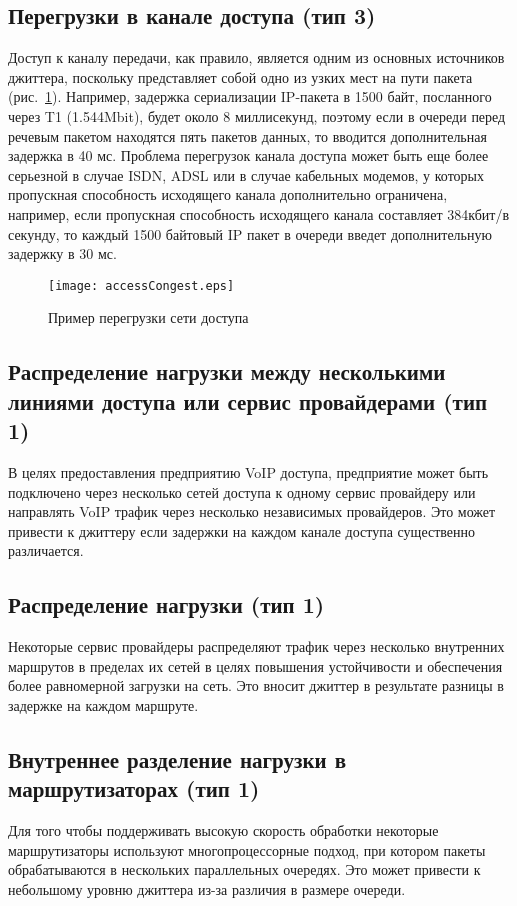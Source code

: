 \subsection{Перегрузки в канале доступа (тип 3) } \label{subsect2_1_3}
Доступ к каналу передачи, как правило, является одним из основных источников джиттера, поскольку представляет собой одно из узких мест на пути пакета (рис. \ref{img:accessCongest}). Например, задержка сериализации IP-пакета в 1500 байт, посланного через T1 (1.544Mbit), будет около 8 миллисекунд, поэтому если в очереди перед речевым пакетом находятся пять пакетов данных, то вводится дополнительная задержка в 40 мс. Проблема перегрузок канала доступа может быть еще более серьезной в случае ISDN, ADSL или в случае кабельных модемов, у которых пропускная способность исходящего канала дополнительно ограничена, например, если пропускная способность исходящего канала составляет 384кбит/в секунду, то каждый 1500 байтовый IP пакет в очереди введет дополнительную задержку в 30 мс.

\begin{figure} [h]
  \center
\texttt{[image: accessCongest.eps]}
  \caption{Пример перегрузки сети доступа \cite{clark}}
  \label{img:accessCongest}
\end{figure}

\subsection{Распределение нагрузки между несколькими линиями доступа или сервис провайдерами (тип 1) } \label{subsect2_1_4}
В целях предоставления предприятию VoIP доступа, предприятие может быть подключено через несколько сетей доступа к одному сервис провайдеру или направлять VoIP трафик через несколько независимых провайдеров. Это может привести к джиттеру если задержки на каждом канале доступа существенно различается.

\subsection{Распределение нагрузки (тип 1) } \label{subsect2_1_5}
Некоторые сервис провайдеры распределяют трафик через несколько внутренних маршрутов в пределах их сетей в целях повышения устойчивости и обеспечения более равномерной загрузки на сеть. Это вносит джиттер в результате разницы в задержке на каждом маршруте.

\subsection{Внутреннее разделение нагрузки в маршрутизаторах (тип 1) } \label{subsect2_1_6}
Для того чтобы поддерживать высокую скорость обработки некоторые маршрутизаторы используют многопроцессорные подход, при котором пакеты обрабатываются в нескольких параллельных очередях. Это может привести к небольшому уровню джиттера из-за различия в размере очереди.

